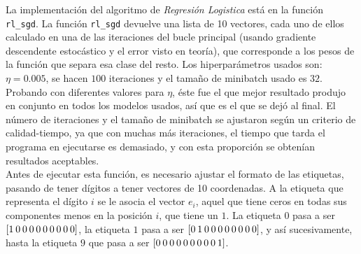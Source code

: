 \documentclass{article}
\begin{document}
La implementación del algoritmo de \textit{Regresión Logistica} está en la función \texttt{rl\_sgd}. La función \texttt{rl\_sgd} devuelve una lista de 10 vectores, cada uno de ellos calculado en una de las iteraciones del bucle principal (usando gradiente descendente estocástico y el error visto en teoría), que corresponde a los pesos de la función que separa esa clase del resto. Los hiperparámetros usados son:
$\eta = 0.005$, se hacen $100$ iteraciones y el tamaño de minibatch usado es $32$. Probando con diferentes valores para $\eta$, éste fue el que mejor resultado produjo en conjunto en todos los modelos usados, así que es el que se dejó al final. El número de iteraciones y el tamaño de minibatch se ajustaron según un criterio de calidad-tiempo, ya que con muchas más iteraciones, el tiempo que tarda el programa en ejecutarse es demasiado, y con esta proporción se obtenían resultados aceptables.\\
Antes de ejecutar esta función, es necesario ajustar el formato de las etiquetas, pasando de tener dígitos a tener vectores de 10 coordenadas. A la etiqueta que representa el dígito $i$ se le asocia el vector $e_i$, aquel que tiene ceros en todas sus componentes menos en la posición $i$, que tiene un $1$. La etiqueta $0$ pasa a ser $[1 \hspace{0.7mm} 0 \hspace{0.7mm} 0 \hspace{0.7mm} 0 \hspace{0.7mm} 0 \hspace{0.7mm} 0 \hspace{0.7mm} 0 \hspace{0.7mm} 0 \hspace{0.7mm} 0 \hspace{0.7mm} 0]$, la etiqueta $1$ pasa a ser $[0 \hspace{0.7mm} 1 \hspace{0.7mm} 0 \hspace{0.7mm} 0 \hspace{0.7mm} 0 \hspace{0.7mm} 0 \hspace{0.7mm} 0 \hspace{0.7mm} 0 \hspace{0.7mm} 0 \hspace{0.7mm} 0]$, y así sucesivamente, hasta la etiqueta $9$  que pasa a ser $[0 \hspace{0.7mm} 0 \hspace{0.7mm} 0 \hspace{0.7mm} 0 \hspace{0.7mm} 0 \hspace{0.7mm} 0 \hspace{0.7mm} 0 \hspace{0.7mm} 0 \hspace{0.7mm} 0 \hspace{0.7mm} 1]$.\\
\end{document}

